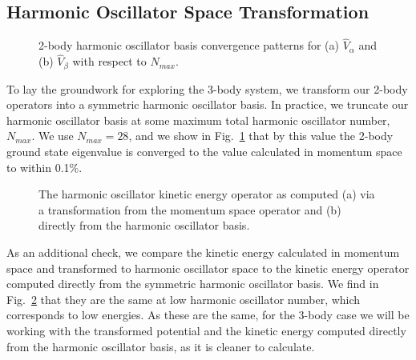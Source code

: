 \subsection{Harmonic Oscillator Space Transformation}
\begin{figure}[t]
\begin{center}
\end{center}
\caption{2-body harmonic oscillator basis convergence patterns for (a) $\hat{V}_\alpha$ and (b) $\hat{V}_\beta$ with respect to $N_{max}$.}
\label{fig:2body_nmax}
\end{figure}

To lay the groundwork for exploring the 3-body system, we transform our 2-body operators into a symmetric harmonic oscillator basis. In practice, we truncate our harmonic oscillator basis at some maximum total harmonic oscillator number, $N_{max}$. We use $N_{max}=28$, and we show in Fig.~\ref{fig:2body_nmax} that by this value the 2-body ground state eigenvalue is converged to the value calculated in momentum space to within 0.1\%.

\begin{figure}[t]
\begin{center}
\end{center}
\caption{The harmonic oscillator kinetic energy operator as computed (a) via a transformation from the momentum space operator and (b) directly from the harmonic oscillator basis.}
\label{fig:2body_kin_comp}
\end{figure}

As an additional check, we compare the kinetic energy calculated in momentum space and transformed to harmonic oscillator space to the kinetic energy operator computed directly from the symmetric harmonic oscillator basis. We find in Fig.~\ref{fig:2body_kin_comp} that they are the same at low harmonic oscillator number, which corresponds to low energies. As these are the same, for the 3-body case we will be working with the transformed potential and the kinetic energy computed directly from the harmonic oscillator basis, as it is cleaner to calculate.%

